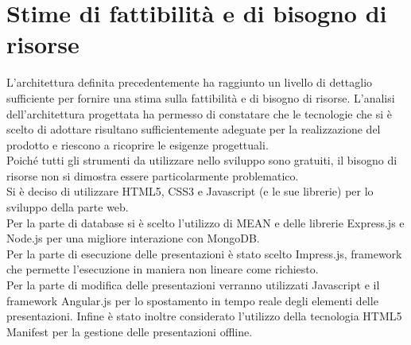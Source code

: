\section{Stime di fattibilità e di bisogno di risorse}{
	L'architettura definita precedentemente ha raggiunto un livello di dettaglio sufficiente per fornire una stima sulla fattibilità e di bisogno di risorse. L'analisi dell'architettura progettata ha permesso di constatare che le tecnologie che si è scelto di adottare risultano sufficientemente adeguate per la realizzazione del prodotto e riescono a ricoprire le esigenze progettuali.\\
	Poiché tutti gli strumenti da utilizzare nello sviluppo sono gratuiti, il bisogno di
	risorse non si dimostra essere particolarmente problematico.\\
	Si è deciso di utilizzare HTML5, CSS3 e Javascript (e le sue librerie) per lo sviluppo della parte web.\\
	Per la parte di database si è scelto l'utilizzo di MEAN e delle librerie Express.js e Node.js per una migliore interazione con MongoDB.\\
	Per la parte di esecuzione delle presentazioni è stato scelto Impress.js, framework che permette l'esecuzione in maniera non lineare come richiesto.\\
	Per la parte di modifica delle presentazioni verranno utilizzati Javascript e il framework Angular.js per lo spostamento in tempo reale degli elementi delle presentazioni.
	Infine è stato inoltre considerato l'utilizzo della tecnologia HTML5 Manifest per la gestione delle presentazioni offline.
	}